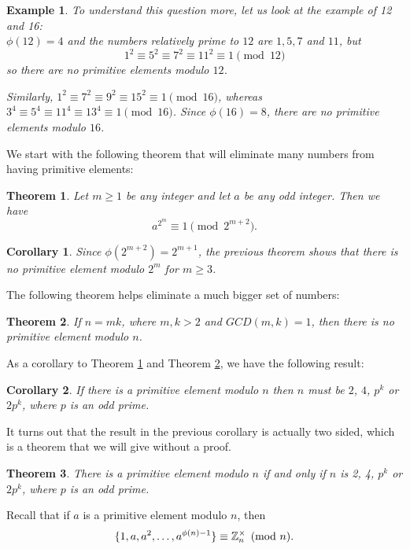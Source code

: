 \documentclass[12pt]{article}
\theoremstyle{plain}
\newtheorem{corollary}{Corollary}
\newtheorem{example}{Example}
\newtheorem{theorem}{Theorem}
\theoremstyle{definition}
\theoremstyle{remark}
\begin{document}
\begin{example}
To understand this question more, let us look at the example of 12 and 16:
\\ $\phi(12)=4$ and the numbers relatively prime to $12$ are $1, 5, 7$ and $11$, but
$$1^2\equiv 5^2\equiv 7^2\equiv 11^2 \equiv 1 \pmod{12}$$ so there are no primitive elements modulo $12$.

Similarly, $1^2 \equiv 7^2 \equiv 9^2 \equiv 15^2 \equiv 1 \pmod{16}$, whereas $3^4 \equiv5^4\equiv 11^4 \equiv 13^4 \equiv 1 \pmod{16}$. Since $\phi(16)=8$, there are no primitive elements modulo $16$.
\end{example}

\bigskip
\noindent
We start with the following theorem that will eliminate many numbers from having primitive elements:
\begin{theorem}\label{prim1}
Let $m\geq 1$ be any integer and let $a$ be any odd integer. Then we have
$$a^{2^m} \equiv 1 \pmod{2^{m+2}}.$$
\end{theorem}
\begin{corollary}
Since $\phi(2^{m+2})=2^{m+1}$, the previous theorem shows that there is no primitive element modulo $2^{m}$ for $m\geq 3$.
\end{corollary}

The following theorem helps eliminate a much bigger set of numbers:
\begin{theorem}\label{prim2}
If $n=mk$, where $m,k>2$ and $GCD(m,k)=1$, then there is no primitive element modulo $n$.
\end{theorem}

\bigskip
\noindent
As a corollary to Theorem \ref{prim1} and Theorem \ref{prim2}, we have the following result:
\begin{corollary}
If there is a primitive element modulo $n$ then $n$ must be $2$, $4$, $p^k$ or $2p^k$, where $p$ is an odd prime.
\end{corollary}

It turns out that the result in the previous corollary is actually two sided, which is a theorem that we will give without a proof.
\begin{theorem}
There is a primitive element modulo $n$ if and only if $n$ is 2, 4, $p^k$ or $2p^k$, where $p$ is an odd prime.
\end{theorem}

\bigskip
\noindent
Recall that if $a$ is a primitive element modulo $n$, then
$$\{1, a, a^2, \dots, a^{\phi(n)-1}\} \equiv \mathbb{Z}_n^{\times} \pmod{n}.$$
\end{document}
